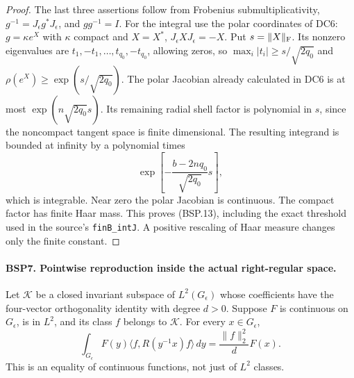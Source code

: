 \begin{proof}
The last three assertions follow from Frobenius submultiplicativity,
$g^{-1}=J_\epsilon g^*J_\epsilon$, and $gg^{-1}=I$.
For the integral use the polar coordinates of DC6:
$g=\kappa e^X$ with $\kappa$ compact and
$X=X^*$, $J_\epsilon XJ_\epsilon=-X$.
Put $s=\|X\|_{\rm F}$.  Its nonzero eigenvalues are
$t_1,-t_1,\ldots,t_{q_0},-t_{q_0}$, allowing zeros, so
$\max_i|t_i|\ge s/\sqrt{2q_0}$ and
$\rho(e^X)\ge\exp(s/\sqrt{2q_0})$.
The polar Jacobian already calculated in DC6 is at most
$\exp(n\sqrt{2q_0}s)$.
Its remaining radial shell factor is polynomial in $s$, since the
noncompact tangent space is finite dimensional.  The resulting
integrand is bounded at infinity by a polynomial times
\[
 \exp\left[-\frac{b-2nq_0}{\sqrt{2q_0}}s\right],
\]
which is integrable.  Near zero the polar Jacobian is continuous.
The compact factor has finite Haar mass.  This proves (BSP.13),
including the exact threshold used in the source's
\texttt{finB\_intJ}.  A positive rescaling of Haar measure changes only
the finite constant.
\end{proof}

\paragraph{BSP7. Pointwise reproduction inside the actual right-regular space.}
\label{claim:BSP7}
Let $\mathcal K$ be a closed invariant subspace of $L^2(G_\epsilon)$
whose coefficients have the four-vector orthogonality identity with
degree $d>0$.  Suppose $F$ is continuous on $G_\epsilon$, is in $L^2$,
and its class $f$ belongs to $\mathcal K$.
For every $x\in G_\epsilon$,
\[
 \int_{G_\epsilon}F(y)
        \langle f,R(y^{-1}x)f\rangle\,dy
           =\frac{\|f\|_2^2}{d}F(x).
 \tag{BSP.14}
\]
This is an equality of continuous functions, not just of $L^2$ classes.

